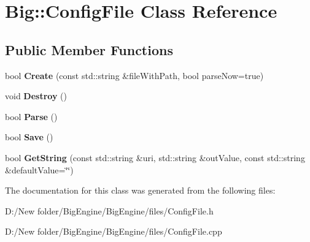 \hypertarget{class_big_1_1_config_file}{}\section{Big\+:\+:Config\+File Class Reference}
\label{class_big_1_1_config_file}
\subsection*{Public Member Functions}
\begin{DoxyCompactItemize}
\item 
\mbox{\label{class_big_1_1_config_file_a9c552b4767a306d6bd5587b3aa1933d4}} 
bool {\bfseries Create} (const std\+::string \&file\+With\+Path, bool parse\+Now=true)
\item 
\mbox{\label{class_big_1_1_config_file_aa050e9dfc237793a5945556723c0f2be}} 
void {\bfseries Destroy} ()
\item 
\mbox{\label{class_big_1_1_config_file_ab9141edfe14abc886bd92e19ccd624df}} 
bool {\bfseries Parse} ()
\item 
\mbox{\label{class_big_1_1_config_file_a9d3afeeb2afc05f7e4f78d771ec80b56}} 
bool {\bfseries Save} ()
\item 
\mbox{\label{class_big_1_1_config_file_afb26f9fe569013c39f471da5df52dba0}} 
bool {\bfseries Get\+String} (const std\+::string \&uri, std\+::string \&out\+Value, const std\+::string \&default\+Value=\char`\"{}\char`\"{})
\end{DoxyCompactItemize}


The documentation for this class was generated from the following files\+:\begin{DoxyCompactItemize}
\item 
D\+:/\+New folder/\+Big\+Engine/\+Big\+Engine/files/Config\+File.\+h\item 
D\+:/\+New folder/\+Big\+Engine/\+Big\+Engine/files/Config\+File.\+cpp\end{DoxyCompactItemize}
